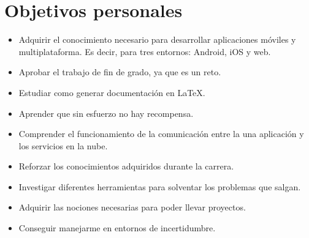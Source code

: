 \section{Objetivos personales}
\begin{itemize}
	\item Adquirir el conocimiento necesario para desarrollar aplicaciones móviles y multiplataforma. Es decir, para tres entornos: Android, iOS y web.
	\item Aprobar el trabajo de fin de grado, ya que es un reto.
	\item Estudiar como generar documentación en \LaTeX.
	\item Aprender que sin esfuerzo no hay recompensa.
	\item Comprender el funcionamiento de la comunicación entre la una aplicación y los servicios en la nube.
	\item Reforzar los conocimientos adquiridos durante la carrera.
	\item Investigar diferentes herramientas para solventar los problemas que salgan.
	\item Adquirir las nociones necesarias para poder llevar proyectos.
	\item Conseguir manejarme en entornos de incertidumbre.
\end{itemize}
